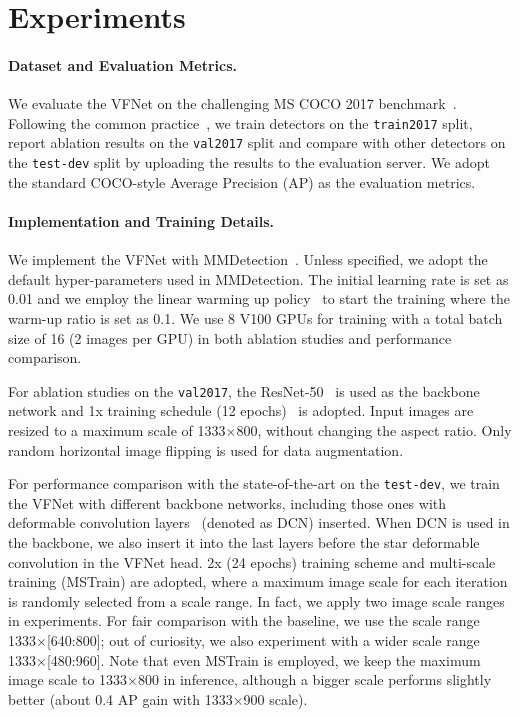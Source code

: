 \section{Experiments}
\paragraph{Dataset and Evaluation Metrics.}
We evaluate the VFNet on the challenging MS COCO 2017 benchmark~\cite{COCO}. Following the common practice~\cite{fasterRCNN, FCOS, retinaNet, ATSS}, we train detectors on the \texttt{train2017} split, report ablation results on the \texttt{val2017} split and compare with other detectors on the \texttt{test-dev} split by uploading the results to the evaluation server. We adopt the standard COCO-style Average Precision (AP) as the evaluation metrics. 

\vspace{-4mm}
\paragraph{Implementation and Training Details.} 
We implement the VFNet with MMDetection~\cite{mmdetection}. Unless specified, we adopt the default hyper-parameters used in MMDetection. The initial learning rate is set as 0.01 and we employ the linear warming up policy~\cite{1hour} to start the training where the warm-up ratio is set as 0.1. We use 8 V100 GPUs for training with a total batch size of 16 (2 images per GPU) in both ablation studies and performance comparison.

For ablation studies on the \texttt{val2017}, the ResNet-50~\cite{ResNet} is used as the backbone network and 1x training schedule (12 epochs)~\cite{mmdetection} is adopted. Input images are resized to a maximum scale of 1333$\times$800, without changing the aspect ratio. Only random horizontal image flipping is used for data augmentation. 

For performance comparison with the state-of-the-art on the \texttt{test-dev}, we train the VFNet with different backbone networks, including those ones with deformable convolution layers~\cite{DCN, DCNv2} (denoted as DCN) inserted. When DCN is used in the backbone, we also insert it into the last layers before the star deformable convolution in the VFNet head.  2x (24 epochs) training scheme and multi-scale training (MSTrain) are adopted, where a maximum image scale for each iteration is randomly selected from a scale range. In fact, we apply two image scale ranges in experiments. For fair comparison with the baseline, we use the scale range 1333$\times$[640:800]; out of curiosity, we also experiment with a wider scale range 1333$\times$[480:960]. Note that even MSTrain is employed, we keep the maximum image scale to 1333$\times$800 in inference, although a bigger scale performs slightly better (about 0.4 AP gain with 1333$\times$900 scale).

